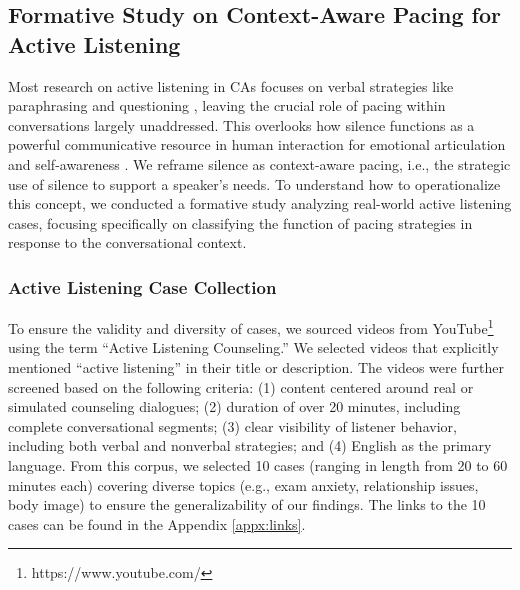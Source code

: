 \subsection{Formative Study on Context-Aware Pacing for Active Listening}

Most research on active listening in CAs focuses on verbal strategies like paraphrasing and questioning \cite{10.1145/3313831.3376131, Tustonja2024active}, leaving the crucial role of pacing within conversations largely unaddressed. This overlooks how silence functions as a powerful communicative resource in human interaction for emotional articulation and self-awareness \cite{gutierrez2024exploration}. We reframe silence as context-aware pacing, i.e., the strategic use of silence to support a speaker's needs. To understand how to operationalize this concept, we conducted a formative study analyzing real-world active listening cases, focusing specifically on classifying the function of pacing strategies in response to the conversational context.

\subsubsection{Active Listening Case Collection}
To ensure the validity and diversity of cases, we sourced videos from YouTube\footnote{https://www.youtube.com/} using the term ``Active Listening Counseling.'' We selected videos that explicitly mentioned ``active listening'' in their title or description. The videos were further screened based on the following criteria: (1) content centered around real or simulated counseling dialogues; (2) duration of over 20 minutes, including complete conversational segments; (3) clear visibility of listener behavior, including both verbal and nonverbal strategies; and (4) English as the primary language. From this corpus, we selected 10 cases (ranging in length from 20 to 60 minutes each) covering diverse topics (e.g., exam anxiety, relationship issues, body image) to ensure the generalizability of our findings. The links to the 10 cases can be found in the Appendix \ref{appx:links}.


